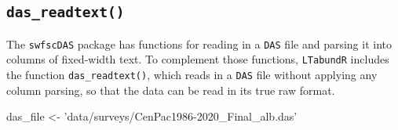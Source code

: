 \documentclass[
]{book}
\newenvironment{Shaded}{\begin{snugshade}}{\end{snugshade}}
\newcommand{\NormalTok}[1]{#1}
\newcommand{\StringTok}[1]{\textcolor[rgb]{0.31,0.60,0.02}{#1}}
\begin{document}
\hypertarget{das_readtext}{%
\subsection*{\texorpdfstring{\texttt{das\_readtext()}}{das\_readtext()}}\label{das_readtext}}

The \texttt{swfscDAS} package has functions for reading in a \texttt{DAS} file and parsing it into columns of fixed-width text. To complement those functions, \texttt{LTabundR} includes the function \texttt{das\_readtext()}, which reads in a \texttt{DAS} file without applying any column parsing, so that the data can be read in its true raw format.

\begin{Shaded}
\begin{Highlighting}[]
\NormalTok{das_file <-}\StringTok{ 'data/surveys/CenPac1986-2020_Final_alb.das'}


\end{Highlighting}
\end{Shaded}
\end{document}
